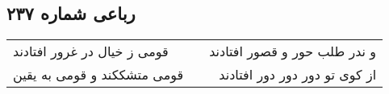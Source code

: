 \begin{center}
\section*{رباعی شماره ۲۳۷}
\label{sec:sh237}
\begin{longtable}{l p{0.5cm} r}
قومی ز خیال در غرور افتادند
&&
و ندر طلب حور و قصور افتادند
\\
قومی متشککند و قومی به یقین
&&
از کوی تو دور دور دور افتادند
\\
\end{longtable}
\end{center}
